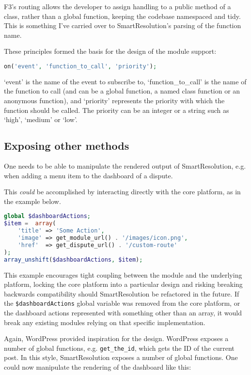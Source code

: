 F3's routing allows the developer to assign handling to a public method of a class, rather than a global function, keeping the codebase namespaced and tidy. This is something I've carried over to SmartResolution's parsing of the function name.

These principles formed the basis for the design of the module support:

\begin{lstlisting}[language=php]
on('event', 'function_to_call', 'priority');
\end{lstlisting}

`event' is the name of the event to subscribe to, `function\_to\_call' is the name of the function to call (and can be a global function, a named class function or an anonymous function), and `priority' represents the priority with which the function should be called. The priority can be an integer or a string such as `high', `medium' or `low'.

\subsection{Exposing other methods}

One needs to be able to manipulate the rendered output of SmartResolution, e.g. when adding a menu item to the dashboard of a dispute.

This \emph{could} be accomplished by interacting directly with the core platform, as in the example below.

\begin{lstlisting}[language=php]
global $dashboardActions;
$item =  array(
    'title' => 'Some Action',
    'image' => get_module_url() . '/images/icon.png',
    'href'  => get_dispute_url() . '/custom-route'
);
array_unshift($dashboardActions, $item);
\end{lstlisting}

This example encourages tight coupling between the module and the underlying platform, locking the core platform into a particular design and risking breaking backwards compatibility should SmartResolution be refactored in the future. If the \lstinline{$dashboardActions} global variable was removed from the core platform, or the dashboard actions represented with something other than an array, it would break any existing modules relying on that specific implementation.

Again, WordPress provided inspiration for the design. WordPress exposes a number of global functions, e.g. \lstinline{get_the_id}, which gets the ID of the current post. In this style, SmartResolution exposes a number of global functions. One could now manipulate the rendering of the dashboard like this:

